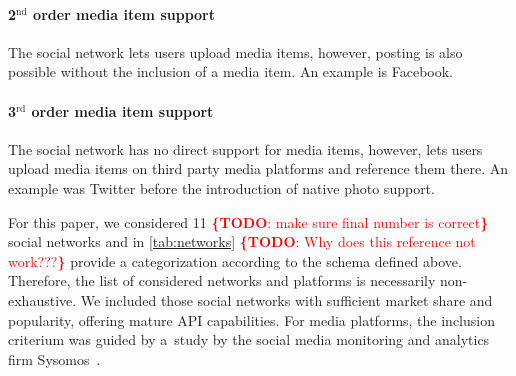 \documentclass{acm_proc_article-sp}
\newcommand{\todo}[1]{\noindent\textcolor{red}{{\bf \{TODO}: #1{\bf \}}}}
\newcommand{\superscript}[1]{\ensuremath{^{\textrm{#1}}}}
\newcommand{\nd}[0]{\superscript{nd}}
\newcommand{\rd}[0]{\superscript{rd}}
\begin{document}
\paragraph{2{\nd} order media item support}
The social network lets users upload media items, however,
posting is also possible without the inclusion of a media item.
An example is Facebook.

\paragraph{3{\rd} order media item support}
The social network has no direct support for media items, however,
lets users upload media items on third party media platforms and reference them there.
An example was Twitter before the introduction of native photo support.

For this paper, we considered 11 \todo{make sure final number is correct} social networks and in \autoref{tab:networks} \todo{Why does this reference not work???} provide a categorization according to the schema defined above.
Therefore, the list of considered networks and platforms is necessarily non-exhaustive.
We included those social networks with sufficient market share and popularity, offering mature API capabilities.
For media platforms, the inclusion criterium was guided by a~study by the social media monitoring and analytics firm Sysomos~\cite{Sysomos2011}.
\end{document}
